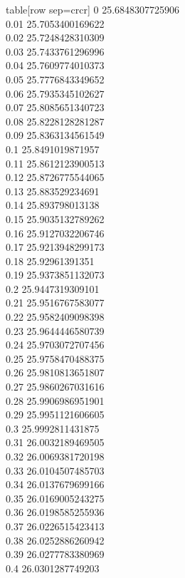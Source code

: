   table[row sep=crcr]{%
0	25.6848307725906\\
0.01	25.7053400169622\\
0.02	25.7248428310309\\
0.03	25.7433761296996\\
0.04	25.7609774010373\\
0.05	25.7776843349652\\
0.06	25.7935345102627\\
0.07	25.8085651340723\\
0.08	25.8228128281287\\
0.09	25.8363134561549\\
0.1	25.8491019871957\\
0.11	25.8612123900513\\
0.12	25.8726775544065\\
0.13	25.883529234691\\
0.14	25.893798013138\\
0.15	25.9035132789262\\
0.16	25.9127032206746\\
0.17	25.9213948299173\\
0.18	25.92961391351\\
0.19	25.9373851132073\\
0.2	25.9447319309101\\
0.21	25.9516767583077\\
0.22	25.9582409098398\\
0.23	25.9644446580739\\
0.24	25.9703072707456\\
0.25	25.9758470488375\\
0.26	25.9810813651807\\
0.27	25.9860267031616\\
0.28	25.9906986951901\\
0.29	25.9951121606605\\
0.3	25.9992811431875\\
0.31	26.0032189469505\\
0.32	26.0069381720198\\
0.33	26.0104507485703\\
0.34	26.0137679699166\\
0.35	26.0169005243275\\
0.36	26.0198585255936\\
0.37	26.0226515423413\\
0.38	26.0252886260942\\
0.39	26.0277783380969\\
0.4	26.0301287749203\\
}
